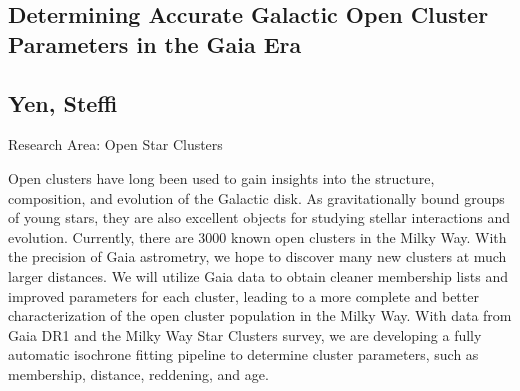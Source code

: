 \subsection*{\centering \large Determining Accurate Galactic Open Cluster Parameters in the Gaia Era}
\subsection*{\centering \normalsize Yen, Steffi}
Research Area: Open Star Clusters\newline

\noindent Open clusters have long been used to gain insights into the structure, composition, and evolution of the Galactic disk. As gravitationally bound groups of young stars, they are also excellent objects for studying stellar interactions and evolution. Currently, there are 3000 known open clusters in the Milky Way. With the precision of Gaia astrometry, we hope to discover many new clusters at much larger distances. We will utilize Gaia data to obtain cleaner membership lists and improved parameters for each cluster, leading to a more complete and better characterization of the open cluster population in the Milky Way. With data from Gaia DR1 and the Milky Way Star Clusters survey, we are developing a fully automatic isochrone fitting pipeline to determine cluster parameters, such as membership, distance, reddening, and age.

